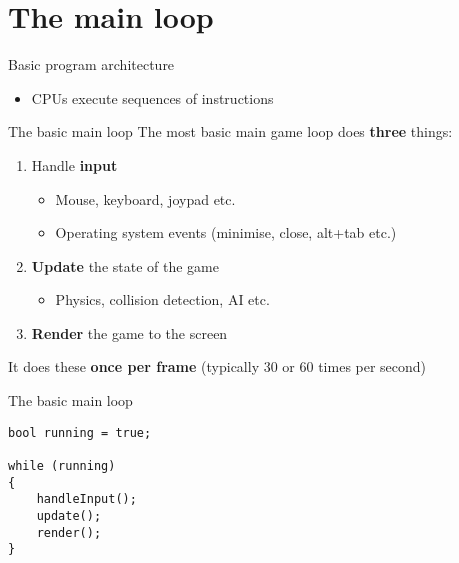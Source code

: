 \part{The main loop}
\frame{\partpage}

\begin{frame}{Basic program architecture}
    \begin{itemize}
        \item CPUs execute sequences of instructions
    \end{itemize}
\end{frame}

\begin{frame}{The basic main loop}
    The most basic main game loop does \textbf{three} things:
    \begin{enumerate}
        \item Handle \textbf{input}
            \begin{itemize}
                \item Mouse, keyboard, joypad etc.
                \item Operating system events (minimise, close, alt+tab etc.)
            \end{itemize}
        \item \textbf{Update} the state of the game
            \begin{itemize}
                \item Physics, collision detection, AI etc.
            \end{itemize}
        \item \textbf{Render} the game to the screen
    \end{enumerate}
    It does these \textbf{once per frame} (typically 30 or 60 times per second)
\end{frame}

\begin{frame}[fragile]{The basic main loop}
    \begin{lstlisting}
bool running = true;

while (running)
{
    handleInput();
    update();
    render();
}
    \end{lstlisting}
\end{frame}

